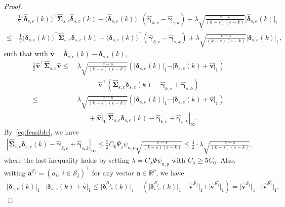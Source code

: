 \documentclass[11pt, a4paper]{article}
\newcommand{\mbf}{\mathbf}
\newcommand{\mc}{\mathcal}
\renewcommand{\l}{\left}
\renewcommand{\r}{\right}
\def\wh{\widehat}
\newcommand{\R}{\mathbb{R}}
\newcommand{\nn}{\nonumber}
\theoremstyle{definition}
\theoremstyle{definition}
\theoremstyle{definition}
\theoremstyle{definition}
\theoremstyle{definition}
\theoremstyle{remark}
\theoremstyle{definition}
\theoremstyle{definition}
\theoremstyle{definition}
\begin{document}
\begin{proof}
	\begin{align}
	& \frac{1}{2} \bigl(\wh{\bm\delta}_{s, e}(k)\bigr)^\top \wh{\bm\Sigma}_{s, e} \wh{\bm\delta}_{s, e}(k) - \bigl(\wh{\bm\delta}_{s, e}(k)\bigr)^\top (\wh{\bm\gamma}_{k, e} - \wh{\bm\gamma}_{s, k}) + \lambda \sqrt{\frac{e - s}{(k - s)(e - k)}} \vert \wh{\bm\delta}_{s, e}(k) \vert_1
	\nn \\
	\le & \, \frac{1}{2} \bigl({\bm\delta}_{s, e}(k)\bigr)^\top \wh{\bm\Sigma}_{s, e} {\bm\delta}_{s, e}(k) - \bigl({\bm\delta}_{s, e}(k)\bigr)^\top (\wh{\bm\gamma}_{k, e} - \wh{\bm\gamma}_{s, k}) + \lambda \sqrt{\frac{e - s}{(k - s)(e - k)}} \vert {\bm\delta}_{s, e}(k) \vert_1, 
	\nn 
	\end{align}
	such that with $\wh{\mbf v} = \wh{\bm\delta}_{s, e}(k) - \bm\delta_{s, e}(k)$,
	\begin{align}
	\frac{1}{2} \wh{\mbf v}^\top \wh{\bm\Sigma}_{s, e} \wh{\mbf v}  \le & \, \lambda \sqrt{\frac{e - s}{(k - s)(e - k)}} \l( \vert \bm\delta_{s, e}(k) \vert_1 - \vert \bm\delta_{s, e}(k) + \wh{\mbf v} \vert_1 \r)
	\nn \\
	&  \qquad - \wh{\mbf v}^\top \l( \wh{\bm\Sigma}_{s, e} {\bm\delta}_{s, e}(k) - \wh{\bm\gamma}_{k, e} + \wh{\bm\gamma}_{s, k} \r)\nn\\
	\le & \, \lambda \sqrt{\frac{e - s}{(k - s)(e - k)}} \l( \vert \bm\delta_{s, e}(k) \vert_1 - \vert \bm\delta_{s, e}(k) + \wh{\mbf v} \vert_1 \r)
	\nn \\
	& \qquad +\vert \wh{\mbf v} \vert_1 \l\vert \wh{\bm\Sigma}_{s, e} {\bm\delta}_{s, e}(k) - \wh{\bm\gamma}_{k, e} + \wh{\bm\gamma}_{s, k} \r\vert_{\infty}.
	\label{eq:lasso:one}
	\end{align}
	By~\eqref{eq:feasible}, we have
	\begin{align}
	\label{eq:feasible:two}
	\l\vert \wh{\bm\Sigma}_{s, e} {\bm\delta}_{s, e}(k) - \wh{\bm\gamma}_{k, e} + \wh{\bm\gamma}_{s, k} \r\vert_\infty \le \frac{5}{2} C_0 \Psi_j \psi_{n, p} \sqrt{\frac{e - s}{(k - s)(e - k)}} \le \frac{1}{2} \cdot \lambda \sqrt{\frac{e - s}{(k - s)(e - k)}},
	\end{align}
	where the last inequality holds by setting $\lambda = C_\lambda \Psi \psi_{n, p}$ with $C_\lambda \ge 5 C_0$. Also, writing $\mbf a^{\mc S_j} = (a_i, \, i \in \mc S_j)^\top$ for any vector $\mbf a \in \R^p$, we have
	\begin{align*}
	\vert \bm\delta_{s, e}(k) \vert_1 - \vert \bm\delta_{s, e}(k) + \wh{\mbf v} \vert_1
	\le \vert \bm\delta_{s, e}^{\mc S_j}(k) \vert_1 - \l( \vert \bm\delta_{s, e}^{\mc S_j}(k) \vert_1 - \vert \wh{\mbf v}^{\mc S_j} \vert_1 + \vert \wh{\mbf v}^{\mc S_j^c} \vert_1 \r) = \vert \wh{\mbf v}^{\mc S_j} \vert_1 - \vert \wh{\mbf v}^{\mc S_j^c} \vert_1.

\end{align*}
\end{proof}
\end{document}
